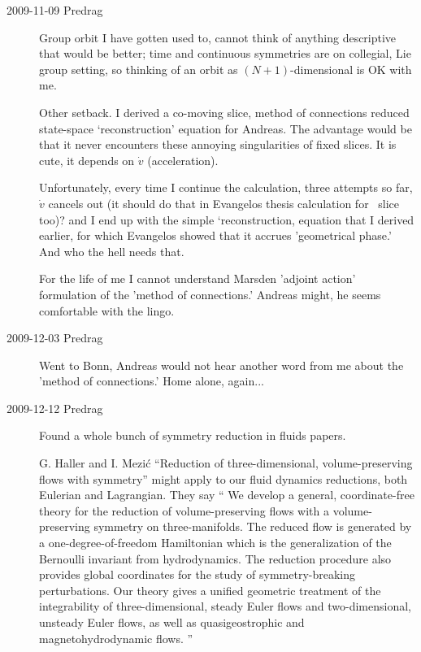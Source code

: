 \begin{description}
\item[2009-11-09 Predrag]
Group orbit I have gotten used to, cannot think of anything descriptive that would be better;
time and continuous symmetries are on collegial, Lie group setting, so thinking of an orbit as
$(N+1)$-dimensional is OK with me.

Other setback. I derived a co-moving slice, method of
connections reduced state-space `reconstruction' equation for
Andreas. The advantage would be that it never encounters these
annoying singularities of fixed slices. It is cute, it depends
on $\dot{v}$ (acceleration).

Unfortunately, every time I continue the calculation, three
attempts so far, $\dot{v}$ cancels out (it should do that in
Evangelos thesis calculation for \reqv\ slice too)? and I end
up with the simple `reconstruction, equation that I derived
earlier, for which Evangelos showed that it accrues
'geometrical phase.' And who the hell needs that.

For the life of me I cannot understand Marsden 'adjoint action'
formulation of the 'method of connections.' Andreas might, he
seems comfortable with the lingo.

\item[2009-12-03 Predrag] Went to Bonn, Andreas would not hear
another word from me about the 'method of connections.' Home
alone, again...

\renewcommand{\LieEl}{\ensuremath{g}}  %
\renewcommand{\gSpace}{\ensuremath{\theta}}   %
\renewcommand{\ssp}{x}

\item[2009-12-12 Predrag] Found a whole bunch of symmetry
reduction in fluids papers.

G. Haller and I. Mezi\'c
``Reduction of three-dimensional, volume-preserving flows
with symmetry''
might apply to our fluid dynamics reductions, both
Eulerian and Lagrangian.
They say ``
We develop a general, coordinate-free theory for the reduction
of volume-preserving flows with a volume-preserving symmetry on
three-manifolds. The reduced flow is generated by a
one-degree-of-freedom Hamiltonian which is the generalization
of the Bernoulli invariant from hydrodynamics. The reduction
procedure also provides global coordinates for the study of
symmetry-breaking perturbations. Our theory gives a unified
geometric treatment of the integrability of three-dimensional,
steady Euler flows and two-dimensional, unsteady Euler flows,
as well as quasigeostrophic and magnetohydrodynamic flows.
''


\end{description}
